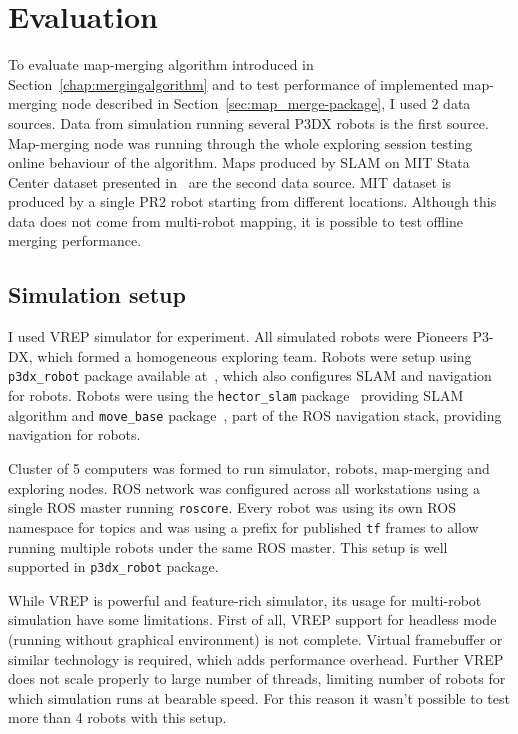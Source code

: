 \chapter{Evaluation}
\label{chap:evaluation}

To evaluate map-merging algorithm introduced in Section~\ref{chap:mergingalgorithm} and to test performance of implemented map-merging node described in Section~\ref{sec:map_merge-package}, I used $2$ data sources. Data from  simulation running several P3DX robots is the first source. Map-merging node was running through the whole exploring session testing online behaviour of the algorithm. Maps produced by \gls{SLAM} on \gls{MIT} Stata Center dataset presented in~\cite{Fallon2013} are the second data source. \gls{MIT} dataset is produced by a single PR2 robot starting from different locations. Although this data does not come from multi-robot mapping, it is possible to test offline merging performance.

\section{Simulation setup}

I used \gls{VREP} simulator for experiment. All simulated robots were Pioneers P3-DX, which formed a homogeneous exploring team. Robots were setup using \texttt{p3dx\_robot} package available at~\cite{GitHubRoboRescue}, which also configures \gls{SLAM} and navigation for robots. Robots were using the \texttt{hector\_slam} package~\cite{2013:RoboCup} providing \gls{SLAM} algorithm and \texttt{move\_base} package~\cite{Marder2016}, part of the \gls{ROS} navigation stack, providing navigation for robots.

Cluster of 5 computers was formed to run simulator, robots, map-merging and exploring nodes. \gls{ROS} network was configured across all workstations using a single \gls{ROS} master running \texttt{roscore}. Every robot was using its own \gls{ROS} namespace for topics and was using a prefix for published \texttt{tf} frames to allow running multiple robots under the same \gls{ROS} master. This setup is well supported in \texttt{p3dx\_robot} package.

While \gls{VREP} is powerful and feature-rich simulator, its usage for multi-robot simulation have some limitations. First of all, \gls{VREP} support for headless mode (running without graphical environment) is not complete. Virtual framebuffer or similar technology is required, which adds performance overhead. Further \gls{VREP} does not scale properly to large number of threads, limiting number of robots for which simulation runs at bearable speed. For this reason it wasn't possible  to test more than 4 robots with this setup.

